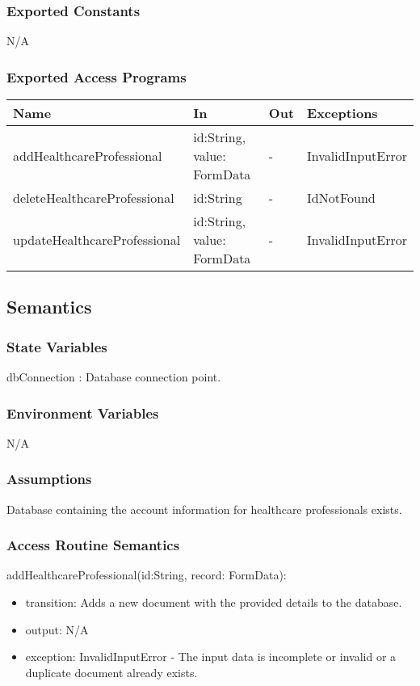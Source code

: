\documentclass[12pt, titlepage]{article}
\begin{document}
\subsubsection{Exported Constants}
N/A

\subsubsection{Exported Access Programs}

\begin{center}
\begin{tabular}{p{4cm} p{4.5cm} p{1cm} p{2.5cm}}
\hline
\textbf{Name} & \textbf{In} & \textbf{Out} & \textbf{Exceptions} \\
\hline
addHealthcareProfessional & id:String, value: FormData & - & InvalidInputError \\
deleteHealthcareProfessional & id:String & - & IdNotFound\\
updateHealthcareProfessional & id:String, value: FormData & - & InvalidInputError \\
\hline
\end{tabular}
\end{center}

\subsection{Semantics}

\subsubsection{State Variables}
dbConnection : Database connection point.

\subsubsection{Environment Variables}
N/A

\subsubsection{Assumptions}
Database containing the account information for healthcare professionals exists.

\subsubsection{Access Routine Semantics}

\noindent addHealthcareProfessional(id:String, record: FormData):
\begin{itemize}
\item transition: Adds a new document with the provided details to the database.
\item output: N/A
\item exception: InvalidInputError - The input data is incomplete or invalid or a duplicate document already exists.
\end{itemize}
\end{document}
